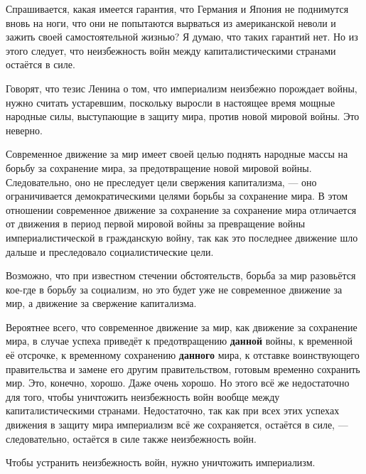 \documentclass[12pt, a4paper, openany]{book}
\begin{document}
Спрашивается, какая имеется гарантия, что Германия и Япония не поднимутся вновь на ноги, что они не попытаются вырваться из американской неволи и зажить своей самостоятельной жизнью? Я думаю, что таких гарантий нет. Но из этого следует, что неизбежность войн между капиталистическими странами остаётся в силе.



Говорят, что тезис Ленина о том, что империализм неизбежно порождает войны, нужно считать устаревшим, поскольку выросли в настоящее время мощные народные силы, выступающие в защиту мира, против новой мировой войны. Это неверно.



Современное движение за мир имеет своей целью поднять народные массы на борьбу за сохранение мира, за предотвращение новой мировой войны. Следовательно, оно не преследует цели свержения капитализма, — оно ограничивается демократическими целями борьбы за сохранение мира. В этом отношении современное движение за сохранение за сохранение мира отличается от движения в период первой мировой войны за превращение войны империалистической в гражданскую войну, так как это последнее движение шло дальше и преследовало социалистические цели.



Возможно, что при известном стечении обстоятельств, борьба за мир разовьётся кое-где в борьбу за социализм, но это будет уже не современное движение за мир, а движение за свержение капитализма.



Вероятнее всего, что современное движение за мир, как движение за сохранение мира, в случае успеха приведёт к предотвращению \textbf{данной} войны, к временной её отсрочке, к временному сохранению \textbf{данного} мира, к отставке воинствующего правительства и замене его другим правительством, готовым временно сохранить мир. Это, конечно, хорошо. Даже очень хорошо. Но этого всё же недостаточно для того, чтобы уничтожить неизбежность войн вообще между капиталистическими странами. Недостаточно, так как при всех этих успехах движения в защиту мира империализм всё же сохраняется, остаётся в силе, — следовательно, остаётся в силе также неизбежность войн.



Чтобы устранить неизбежность войн, нужно уничтожить империализм.



\vspace{0.4cm}
\end{document}

